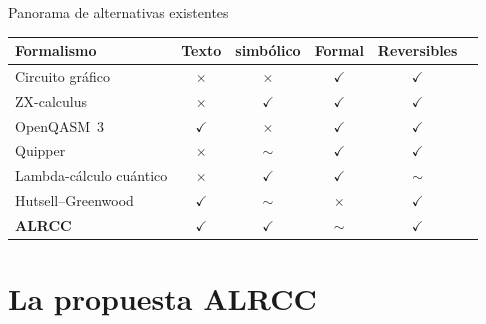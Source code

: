 \documentclass[12pt, aspectratio=169]{beamer}
\newcommand{\yes}{\textcolor{alrcc-green}{$\checkmark$}}
\newcommand{\no}{\textcolor{alrcc-red}{$\times$}}
\newcommand{\maybe}{\textcolor{alrcc-orange}{$\sim$}}
\begin{document}
\begin{frame}{Panorama de alternativas existentes}
  \centering
  \small
  \begin{tabular}{lccccc}
    \toprule
    \textbf{Formalismo}     & \textbf{Texto}  & \textbf{simbólico}
                            & \textbf{Formal} & \textbf{Reversibles}                   \\
    \midrule
    Circuito gráfico        & \no             & \no                  & \yes   & \yes   \\
    ZX-calculus             & \no             & \yes                 & \yes   & \yes   \\
    OpenQASM~3              & \yes            & \no                  & \yes   & \yes   \\
    Quipper                 & \no             & \maybe               & \yes   & \yes   \\
    Lambda-cálculo cuántico & \no             & \yes                 & \yes   & \maybe \\
    Hutsell--Greenwood      & \yes            & \maybe               & \no    & \yes   \\
    \midrule
    \textbf{ALRCC}          & \yes            & \yes                 & \maybe & \yes   \\
    \bottomrule
  \end{tabular}
\end{frame}

\section{La propuesta ALRCC}
\end{document}
